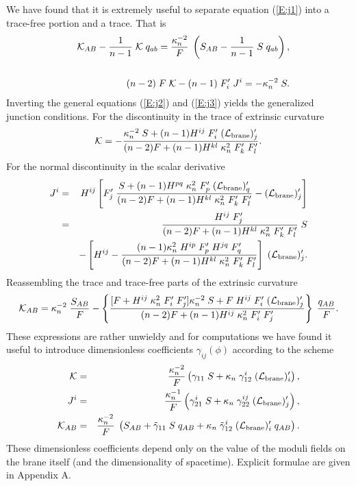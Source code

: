 \documentclass[a4paper,10pt]{article}
\begin{document}
%
We have found that it is extremely useful to separate equation
(\ref{E:j1}) into a trace-free portion and a trace. That is
%
\begin{eqnarray} 
&&
{\mathcal K}_{AB} - {1\over n-1} \; {\mathcal K} \; q_{ab} =
{\kappa_n^{-2}\over F} 
\; \left(S_{AB} - {1\over n-1} \; S \; q_{ab}\right), 
\label{E:j-tracefree}
\\
\nonumber
\\
&&
(n-2) \; F \; {\mathcal K} - (n-1) \; F'_i \; J^i =  -  \kappa_n^{-2} \;S.
\label{E:j3}
\end{eqnarray}
%
Inverting the general equations (\ref{E:j2}) and (\ref{E:j3}) yields
the generalized junction conditions.  For the discontinuity in the
trace of extrinsic curvature
%
\begin{equation}
{\mathcal K}=
-{
 \kappa_n^{-2} \; S + (n-1) H^{ij} \; F'_i \;({\mathcal L}_{\mathrm{brane}})'_j
\over
(n-2) F + (n-1) H^{kl} \;\kappa_n^2 \; F'_k \; F'_l
}.
\label{E:j-trace}
\end{equation}
%
For the normal discontinuity in the scalar derivative
%
\begin{eqnarray} 
J^i &=& 
H^{ij}  
\left[ 
F'_j \; 
{ 
S + (n-1) H^{pq} \; \kappa_n^{2} \; F'_p  \;({\mathcal L}_{\mathrm{brane}})'_q 
\over 
(n-2) F + 
(n-1) H^{kl} \;  \kappa_n^2 \; F'_k \; F'_l
}
-  ({\mathcal L}_{\mathrm{brane}})'_j 
\right]
\\
&=&   
{
H^{ij}\;  F'_j \; 
\over
(n-2) F + (n-1) H^{kl} \; \kappa_n^2 \; F'_k \; F'_l 
} \; S
\\
&&-
\left[ H^{ij}  -
{
(n-1) \kappa_n^2 \; H^{ip} \; F'_p  \; H^{jq}  \; F'_q
\over
(n-2) F + (n-1) H^{kl} \; \kappa_n^2\; F'_k \; F'_l 
}
\right]
\;({\mathcal L}_{\mathrm{brane}})'_j. 
\nonumber
\label{E:j-phi} 
\end{eqnarray} 
%
Reassembling the trace and trace-free parts of the extrinsic curvature
% 
\begin{equation} 
{\mathcal K}_{AB} 
= 
\kappa_n^{-2}\; {S_{AB} \over F } 
- 
\left\{ 
{ 
[F + H^{ij} \;\kappa_n^2 \; F'_i \; F'_j ] \kappa_n^{-2}\; S  
+ F \; H^{ij}\; F'_i\; ({\mathcal L}_{\mathrm{brane}})'_j 
\over 
(n-2) F +  (n-1) H^{ij}\;  \kappa_n^2\; F'_i\;F'_j
}  
\right\} 
\; {q_{AB}\over F}. 
\label{E:j-reassemble} 
\end{equation} 
%
These expressions are rather unwieldy and for computations we have
found it useful to introduce dimensionless coefficients
$\gamma_{ij}(\phi)$ according to the scheme
%
\begin{eqnarray}
{\mathcal K} &=& {\kappa_n^{-2} \over F} 
\left( 
\gamma_{11} \; S + \kappa_n \; \gamma_{12}^i \; ({\mathcal L}_{\mathrm{brane}})'_i
\right),
\label{E:j-k-2}
\\
J^i &=& {\kappa_n^{-1} \over F} 
\left( 
\gamma_{21}^i \; S + \kappa_n \;  \gamma_{22}^{ij} \; ({\mathcal L}_{\mathrm{brane}})'_j
\right), 
\label{E:j-phi-2}
\\
{\mathcal K}_{AB}
&=&
{ \kappa_n^{-2} \over F } \; 
\left(
S_{AB} + \tilde\gamma_{11} \; S \; q_{AB} + 
\kappa_n \; \tilde\gamma_{12}^i \; ({\mathcal L}_{\mathrm{brane}})'_i \; q_{AB}
\right).
\label{E:j-reassemble-2}
\end{eqnarray}
%
These dimensionless coefficients depend only on the value of the
moduli fields on the brane itself (and the dimensionality of
spacetime). Explicit formulae are given in Appendix A.
\end{document}

